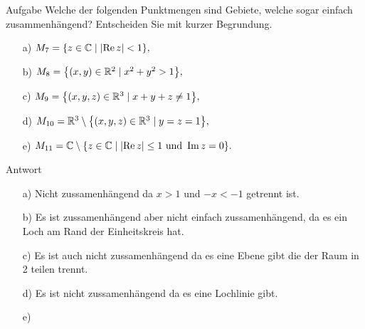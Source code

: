 \documentclass{scrartcl}
\begin{document}
\begin{section}{Aufgabe}
    Welche der folgenden Punktmengen sind Gebiete, welche sogar einfach zusammenhängend?
Entscheiden Sie mit kurzer Begrundung.
\begin{itemize}
    \item[a)] \(M_7=\qty{z\in\mathbb{C}\mid \abs{\Re z}<1},\)
    \item[b)] \(M_8=\qty{\left(x,y\right) \in\mathbb{R}^2 \mid x^2+y^2>1},\)
    \item[c)] \(M_9=\qty{\left(x,y,z\right) \in\mathbb{R}^3 \mid x+y+z\neq 1},\)
    \item[d)] \(M_{10}=\mathbb{R}^3 \setminus \qty{\left(x,y,z\right) \in\mathbb{R}^3 \mid y=z= 1},\)
    \item[e)] \(M_{11}=\mathbb{C} \setminus \qty{z \in\mathbb{C}\mid \abs{\Re z}\leq 1 \text{ und } \Im z=0}.\)
\end{itemize}
      \begin{subsection}{Antwort}
        \begin{itemize}
\item[a)]
Nicht zussamenhängend da $x>1$ und $-x<-1$ getrennt ist.
\item[b)] Es ist zussamenhängend aber nicht einfach zussamenhängend, da es ein Loch am Rand der Einheitskreis hat.
\item[c)] Es ist auch nicht zussamenhängend da es eine Ebene gibt die der Raum in 2 teilen trennt.
\item[d)] Es ist nicht zussamenhängend da es eine Lochlinie gibt.
\item[e)]  



            \end{itemize}
    \end{subsection}  
\end{section}
\end{document}
